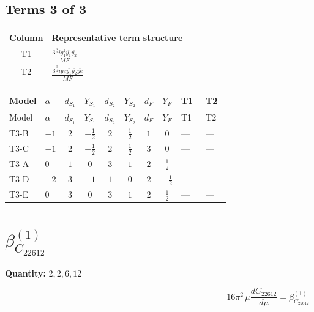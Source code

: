 \documentclass[8pt]{article}
\begin{document}
\begin{landscape}
\subsection*{Terms 3 of 3}
\begin{center}
\begin{tabular}{@{}c >{\raggedright\arraybackslash}p{0.82\linewidth}@{}}
\toprule
Column & Representative term structure \\
\midrule
T1 & \(\displaystyle \frac{3^{\frac{3}{4}} i g_{1}^{2} \overline{y_{1}} \overline{y_{2}}}{MF}\) \\
\midrule
T2 & \(\displaystyle \frac{3^{\frac{3}{4}} i ye \overline{y_{1}} \overline{y_{2}} \overline{ye}}{MF}\) \\
\midrule
\bottomrule
\end{tabular}
\end{center}
\smallskip
\tiny
\begin{longtable}{@{}llcccccc >{\raggedright\arraybackslash}p{0.21\linewidth} >{\raggedright\arraybackslash}p{0.21\linewidth}@{}}
\toprule
Model & $\alpha$ & $d_{S_1}$ & $Y_{S_1}$ & $d_{S_2}$ & $Y_{S_2}$ & $d_F$ & $Y_F$ & T1 & T2 \\
\midrule
\endfirsthead
\toprule
Model & $\alpha$ & $d_{S_1}$ & $Y_{S_1}$ & $d_{S_2}$ & $Y_{S_2}$ & $d_F$ & $Y_F$ & T1 & T2 \\
\midrule
\endhead
T3-B & $-1$ & $2$ & $-\frac{1}{2}$ & $2$ & $\frac{1}{2}$ & $1$ & $0$ & --- & --- \\
\midrule
T3-C & $-1$ & $2$ & $-\frac{1}{2}$ & $2$ & $\frac{1}{2}$ & $3$ & $0$ & --- & --- \\
\midrule
T3-A & $0$ & $1$ & $0$ & $3$ & $1$ & $2$ & $\frac{1}{2}$ & --- & --- \\
\midrule
T3-D & $-2$ & $3$ & $-1$ & $1$ & $0$ & $2$ & $-\frac{1}{2}$ & \scriptsize\adjustbox{max width=\linewidth}{$\begin{gathered} - \frac{3^{\frac{3}{4}} i g_{1}^{2} \overline{y_{1}} \overline{y_{2}}}{8 MF}\end{gathered}$} & \scriptsize\adjustbox{max width=\linewidth}{$\begin{gathered} \frac{3^{\frac{3}{4}} i ye \overline{y_{1}} \overline{y_{2}} \overline{ye}}{12 MF}\end{gathered}$} \\
\midrule
T3-E & $0$ & $3$ & $0$ & $3$ & $1$ & $2$ & $\frac{1}{2}$ & --- & --- \\
\midrule
\bottomrule
\end{longtable}
\clearpage
\section*{$\beta_{C_{22612}}^{(1)}$}
\noindent\textbf{Quantity: }$\mathrm{2,2,6,12}$\par\smallskip
\[16\pi^2\,\mu\frac{d C_{22612}}{d\mu}=\beta_{C_{22612}}^{(1)}\]

\end{landscape}
\end{document}
